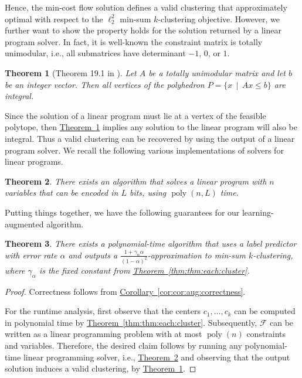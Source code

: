 \documentclass[11pt]{article}
\newtheorem{theorem}{Theorem}[section]
\newcommand{\namedref}[2]{\hyperref[#2]{#1~\ref*{#2}}}
\newcommand{\thmlab}[1]{\label{thm:#1}}
\newcommand{\thmref}[1]{\namedref{Theorem}{thm:#1}}
\newcommand{\corref}[1]{\namedref{Corollary}{cor:#1}}
\def \calF    {\mdef{\mathcal{F}}}
\newcommand{\mdef}[1]{{\ensuremath{#1}}\xspace}  %
\DeclareMathOperator*{\poly}{poly}
\begin{document}
Hence, the min-cost flow solution defines a valid clustering that approximately optimal with respect to the $\ell_2^2$ min-sum $k$-clustering objective. 
However, we further want to show the property holds for the solution returned by a linear program solver. 
In fact, it is well-known the constraint matrix is totally unimodular, i.e., all submatrices have determinant $-1$, $0$, or $1$. 
\begin{theorem}
[Theorem 19.1 in \cite{schrijver1998theory}]
\thmlab{thm:unimodular:corner}
Let $A$ be a totally unimodular matrix and let $b$ be an integer vector. 
Then all vertices of the polyhedron $P=\{x\,\mid\,Ax\le b\}$ are integral. 
\end{theorem}
Since the solution of a linear program must lie at a vertex of the feasible polytope, then \thmref{thm:unimodular:corner} implies any solution to the linear program will also be integral. 
Thus a valid clustering can be recovered by using the output of a linear program solver. 
We recall the following various implementations of solvers for linear programs.
\begin{theorem}
\thmlab{thm:lp:solver}
\cite{Karmarkar84,Vaidya89a,Vaidya90,LeeS15,LeeSZ19,CohenLS21,JiangSWZ21}
There exists an algorithm that solves a linear program with $n$ variables that can be encoded in $L$ bits, using $\poly(n,L)$ time.
\end{theorem}
Putting things together, we have the following guarantees for our learning-augmented algorithm.
\begin{theorem}
There exists a polynomial-time algorithm that uses a label predictor with error rate $\alpha$ and outputs a $\frac{1+\gamma_\alpha\alpha}{(1-\alpha)^2}$-approximation to min-sum $k$-clustering, where $\gamma_\alpha$ is the fixed constant from \thmref{thm:each:cluster}. 
\end{theorem}
\begin{proof}
Correctness follows from \corref{cor:aug:correctness}. 

For the runtime analysis, first observe that the centers $c_1,\ldots,c_k$ can be computed in polynomial time by \thmref{thm:each:cluster}. 
Subsequently, $\calF$ can be written as a linear programming problem with at most $\poly(n)$ constraints and variables. 
Therefore, the desired claim follows by running any polynomial-time linear programming solver, i.e., \thmref{thm:lp:solver} and observing that the output solution induces a valid clustering, by \thmref{thm:unimodular:corner}. 
\end{proof}
\end{document}
